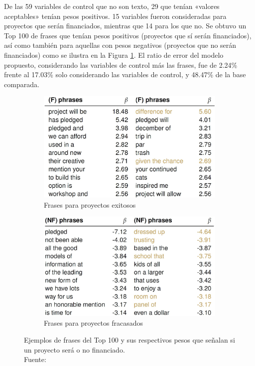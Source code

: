 De las 59 variables de control que no son texto, 29 que tenían «valores aceptables» tenían pesos positivos. 15 variables fueron consideradas para proyectos que serán financiados, mientras que 14 para los que no. Se obtuvo un Top 100 de frases que tenían pesos positivos (proyectos que sí serán financiados), así como también para aquellas con pesos negativos (proyectos que no serán financiados) como se ilustra en la Figura \ref{2:fig112}. El ratio de error del modelo propuesto, considerando las variables de control más las frases, fue de 2.24\% frente al 17.03\% solo considerando las variables de control, y 48.47\% de la base comparada.

\begin{figure}[!ht]
	\centering
	\small
	\begin{subfigure}{.5\textwidth}
		\centering
		\includegraphics[width=0.90\linewidth]{2/figures/mitra2014_resultadoA.jpg}
		\caption{Frases para proyectos exitosos}
	\end{subfigure}%
	\begin{subfigure}{.5\textwidth}
		\centering
		\includegraphics[width=0.90\linewidth]{2/figures/mitra2014_resultadoB.jpg}
		\caption{Frases para proyectos fracasados}
	\end{subfigure}
	\caption[Ejemplos de frases del Top 100 y sus respectivos pesos que señalan si un proyecto será o no financiado]{Ejemplos de frases del Top 100 y sus respectivos pesos que señalan si un proyecto será o no financiado.\\
		Fuente: \cite{pr_mitra2014phrases}}
	\label{2:fig112}
\end{figure}

